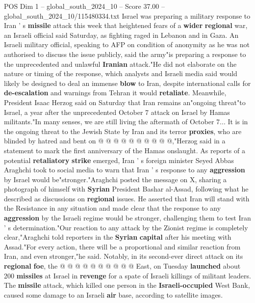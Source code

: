 \begin{textsample}{POS Dim 1 – global\_south\_2024\_10 – Score 37.00 – global\_south\_2024\_10/115480334.txt}  \label{ex:f1_pos_023}
Israel was preparing a military response to Iran ' s \textbf{missile} attack this week that heightened fears of a \textbf{wider} \textbf{regional} war, an Israeli official said Saturday, as fighting raged in Lebanon and in Gaza.
An Israeli military official, speaking to AFP on condition of anonymity as he was not authorised to discuss the issue publicly, said the army"is preparing a response to the unprecedented and unlawful \textbf{Iranian} attack."He did not elaborate on the nature or timing of the response, which analysts and Israeli media said would likely be designed to deal an immense \textbf{blow} to Iran, despite international calls for \textbf{de-escalation} and warnings from Tehran it would \textbf{retaliate}.
Meanwhile, President Isaac Herzog said on Saturday that Iran remains an"ongoing threat"to Israel, a year after the unprecedented October 7 attack on Israel by Hamas militants."In many senses, we are still living the aftermath of October 7...
It is in the ongoing threat to the Jewish State by Iran and its terror \textbf{proxies}, who are blinded by hatred and bent on @ @ @ @ @ @ @ @ @ @,"Herzog said in a statement to mark the first anniversary of the Hamas onslaught.
As reports of a potential \textbf{retaliatory} \textbf{strike} emerged, Iran ' s foreign minister Seyed Abbas Araghchi took to social media to warn that Iran ' s response to any \textbf{aggression} by Israel would be"stronger."Araghchi posted the message on X, sharing a photograph of himself with \textbf{Syrian} President Bashar al-Assad, following what he described as discussions on \textbf{regional} issues.
He asserted that Iran will stand with the Resistance in any situation and made clear that the response to any \textbf{aggression} by the Israeli regime would be stronger, challenging them to test Iran ' s determination."Our reaction to any attack by the Zionist regime is completely clear,"Araghchi told reporters in the \textbf{Syrian} \textbf{capital} after his meeting with Assad."For every action, there will be a proportional and similar reaction from Iran, and even stronger,"he said.
Notably, in its second-ever direct attack on its \textbf{regional} \textbf{foe}, the @ @ @ @ @ @ @ @ @ @ East, on Tuesday \textbf{launched} about 200 \textbf{missiles} at Israel in \textbf{revenge} for a spate of Israeli killings of militant leaders.
The \textbf{missile} attack, which killed one person in the \textbf{Israeli-occupied} West Bank, caused some damage to an Israeli \textbf{air} base, according to satellite images.

\end{textsample}
